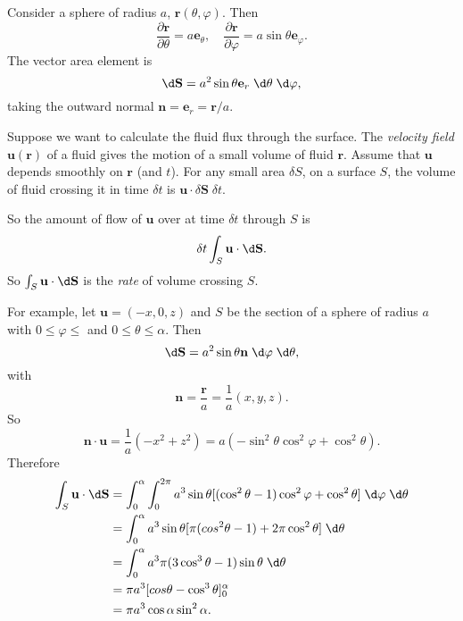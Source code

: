 \documentclass[a4paper]{article}
\begin{document}
\begin{eg}
  Consider a sphere of radius $a$, $\mathbf{r}(\theta, \varphi)$. Then
  \[
    \frac{\partial \mathbf{r}}{\partial \theta} = a\mathbf{e}_\theta,\quad \frac{\partial \mathbf{r}}{\partial \varphi} = a\sin \theta \mathbf{e}_\varphi.
  \]
  The vector area element is
  \[
    \d \mathbf{S} = a^2\sin \theta \mathbf{e}_r \;\d \theta\; \d\varphi,
  \]
  taking the outward normal $\mathbf{n} = \mathbf{e}_r = \mathbf{r}/a$.

  Suppose we want to calculate the fluid flux through the surface. The \emph{velocity field} $\mathbf{u}(\mathbf{r})$ of a fluid gives the motion of a small volume of fluid $\mathbf{r}$. Assume that $\mathbf{u}$ depends smoothly on $\mathbf{r}$ (and $t$). For any small area $\delta S$, on a surface $S$, the volume of fluid crossing it in time $\delta t$ is $\mathbf{u}\cdot \delta \mathbf{S}\; \delta t$.
  \begin{center}
  \end{center}
  So the amount of flow of $\mathbf{u}$ over at time $\delta t$ through $S$ is
  \[
    \delta t\int_S \mathbf{u}\cdot \d \mathbf{S}.
  \]
  So $\int_S \mathbf{u}\cdot \d \mathbf{S}$ is the \emph{rate} of volume crossing $S$.

  For example, let $\mathbf{u} = (-x, 0, z)$ and $S$ be the section of a sphere of radius $a$ with $0 \leq \varphi \leq$ and $0 \leq \theta \leq \alpha$. Then
  \[
    \d \mathbf{S} = a^2 \sin \theta \mathbf{n}\;\d \varphi \;\d \theta,
  \]
  with
  \[
    \mathbf{n} = \frac{\mathbf{r}}{a} = \frac{1}{a}(x, y, z).
  \]
  So
  \[
    \mathbf{n}\cdot \mathbf{u} = \frac{1}{a}(-x^2 + z^2) = a(-\sin^2\theta\cos^2\varphi + \cos^2 \theta).
  \]
  Therefore
  \begin{align*}
    \int_S \mathbf{u}\cdot \d \mathbf{S} &= \int_0^\alpha \int_0^{2\pi} a^3 \sin \theta[(\cos^2\theta - 1) \cos^2 \varphi + \cos^2 \theta]\;\d \varphi\;\d \theta\\
    &= \int_0^\alpha a^3\sin \theta[\pi(cos^2\theta - 1) + 2\pi \cos^2\theta]\; \d \theta\\
    &=\int_0^\alpha a^3\pi(3\cos^3 \theta - 1)\sin \theta\;\d \theta\\
    &= \pi a^3[cos\theta - \cos^3 \theta]_0^\alpha\\
    &= \pi a^3 \cos \alpha\sin^2 \alpha.
  \end{align*}
\end{eg}
\end{document}
